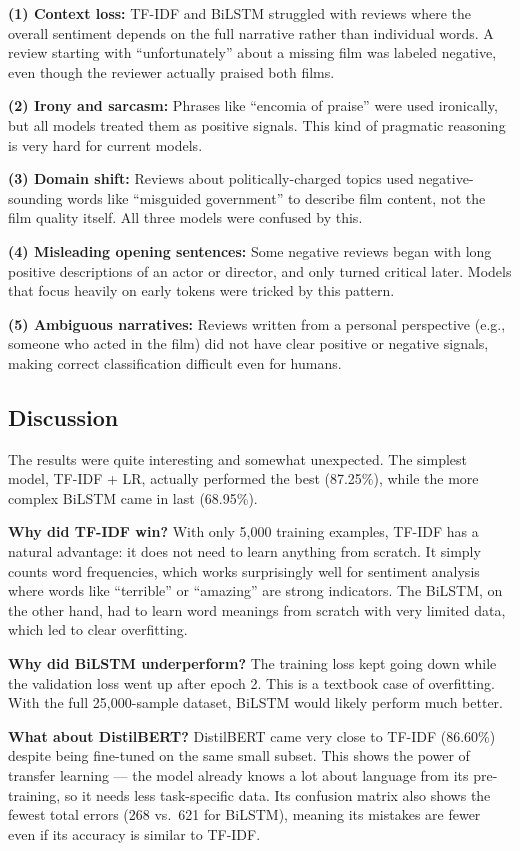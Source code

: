 \documentclass[12pt,a4paper]{article}
\begin{document}
\textbf{(1) Context loss:} TF-IDF and BiLSTM struggled with reviews where the
overall sentiment depends on the full narrative rather than individual words.
A review starting with ``unfortunately'' about a missing film was labeled
negative, even though the reviewer actually praised both films.

\textbf{(2) Irony and sarcasm:} Phrases like ``encomia of praise'' were used
ironically, but all models treated them as positive signals. This kind of
pragmatic reasoning is very hard for current models.

\textbf{(3) Domain shift:} Reviews about politically-charged topics used
negative-sounding words like ``misguided government'' to describe film content,
not the film quality itself. All three models were confused by this.

\textbf{(4) Misleading opening sentences:} Some negative reviews began with
long positive descriptions of an actor or director, and only turned critical
later. Models that focus heavily on early tokens were tricked by this pattern.

\textbf{(5) Ambiguous narratives:} Reviews written from a personal perspective
(e.g., someone who acted in the film) did not have clear positive or negative
signals, making correct classification difficult even for humans.

\subsection{Discussion}

The results were quite interesting and somewhat unexpected. The simplest model,
TF-IDF + LR, actually performed the best (87.25\%), while the more complex
BiLSTM came in last (68.95\%). 

\textbf{Why did TF-IDF win?} With only 5{,}000 training examples, TF-IDF has
a natural advantage: it does not need to learn anything from scratch. It simply
counts word frequencies, which works surprisingly well for sentiment analysis
where words like ``terrible'' or ``amazing'' are strong indicators. The BiLSTM,
on the other hand, had to learn word meanings from scratch with very limited
data, which led to clear overfitting.

\textbf{Why did BiLSTM underperform?} The training loss kept going down while
the validation loss went up after epoch 2. This is a textbook case of
overfitting. With the full 25{,}000-sample dataset, BiLSTM would likely
perform much better.

\textbf{What about DistilBERT?} DistilBERT came very close to TF-IDF (86.60\%)
despite being fine-tuned on the same small subset. This shows the power of
transfer learning — the model already knows a lot about language from its
pre-training, so it needs less task-specific data. Its confusion matrix also
shows the fewest total errors (268 vs.\ 621 for BiLSTM), meaning its mistakes
are fewer even if its accuracy is similar to TF-IDF.
\end{document}
